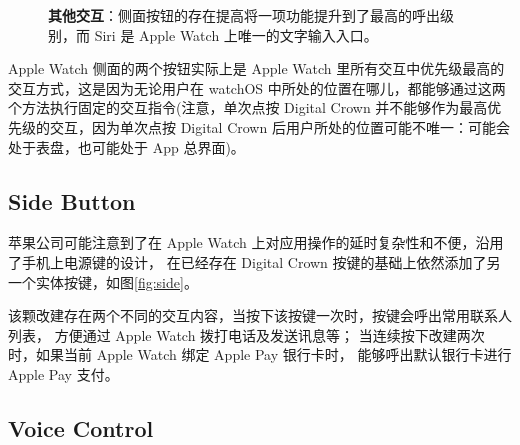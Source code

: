 \begin{figure}[H]
    \kaishu
    \centering
    \caption{\textbf{其他交互}：侧面按钮的存在提高将一项功能提升到了最高的呼出级别，而 Siri 是 Apple Watch 上唯一的文字输入入口。}
    \label{fig:others}
\end{figure}

Apple Watch 侧面的两个按钮实际上是 Apple Watch 里所有交互中优先级最高的交互方式，这是因为无论用户在 watchOS 中所处的位置在哪儿，都能够通过这两个方法执行固定的交互指令(注意，单次点按 Digital Crown 并不能够作为最高优先级的交互，因为单次点按 Digital Crown 后用户所处的位置可能不唯一：可能会处于表盘，也可能处于 App 总界面)。

\subsection{Side Button}

苹果公司可能注意到了在 Apple Watch 上对应用操作的延时复杂性和不便，沿用了手机上电源键的设计，
在已经存在 Digital Crown 按键的基础上依然添加了另一个实体按键，如图\ref{fig:side}。

该颗改建存在两个不同的交互内容，当按下该按键一次时，按键会呼出常用联系人列表，
方便通过 Apple Watch 拨打电话及发送讯息等；
当连续按下改建两次时，如果当前 Apple Watch 绑定 Apple Pay 银行卡时，
能够呼出默认银行卡进行 Apple Pay 支付。

\subsection{Voice Control}

